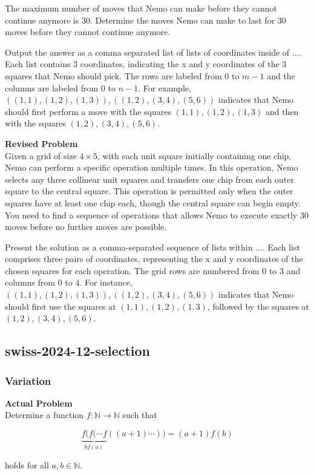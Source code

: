 The maximum number of moves that Nemo can make before they cannot continue anymore is 30. Determine the moves Nemo can make to last for 30 moves before they cannot continue anymore.

Output the answer as a comma separated list of lists of coordinates inside of $\boxed{...}$. Each list contains 3 coordinates, indicating the x and y coordinates of the 3 squares that Nemo should pick. The rows are labeled from $0$ to $m-1$ and the columns are labeled from $0$ to $n-1$. For example, $\boxed{((1,1),(1,2),(1,3)),((1,2),(3,4),(5,6))}$ indicates that Nemo should first perform a move with the squares $(1,1), (1,2), (1,3)$ and then with the squares $(1,2),(3,4),(5,6)$.

\textbf{Revised Problem}\\
Given a grid of size $4 \times 5$, with each unit square initially containing one chip, Nemo can perform a specific operation multiple times. In this operation, Nemo selects any three collinear unit squares and transfers one chip from each outer square to the central square. This operation is permitted only when the outer squares have at least one chip each, though the central square can begin empty. You need to find a sequence of operations that allows Nemo to execute exactly 30 moves before no further moves are possible.

Present the solution as a comma-separated sequence of lists within $\boxed{...}$. Each list comprises three pairs of coordinates, representing the x and y coordinates of the chosen squares for each operation. The grid rows are numbered from $0$ to $3$ and columns from $0$ to $4$. For instance, $\boxed{((1,1),(1,2),(1,3)),((1,2),(3,4),(5,6))}$ indicates that Nemo should first use the squares at $(1,1), (1,2), (1,3)$, followed by the squares at $(1,2), (3,4), (5,6)$.

\subsection{swiss-2024-12-selection}
\subsubsection{Variation}
\textbf{Actual Problem}\\
Determine a function $f: \mathbb{N} \rightarrow \mathbb{N}$ such that 

$$\underbrace{f(f(\cdots f}_{b f(a)}((a+1) \cdots)) = (a+1)f(b)$$

holds for all $a,b \in \mathbb{N}$.

